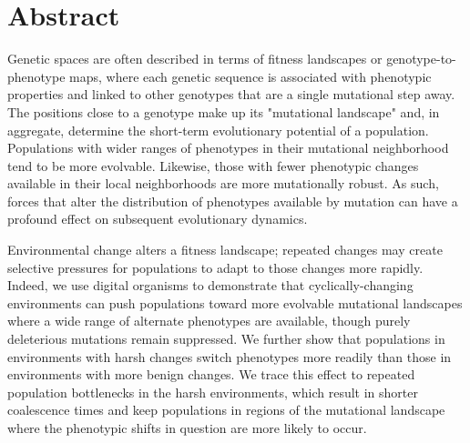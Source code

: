 \documentclass[10pt,letterpaper]{article}
\begin{document}
\section*{Abstract}
Genetic spaces are often described in terms of fitness landscapes or genotype-to-phenotype maps, where each genetic sequence is associated with phenotypic properties and linked to other genotypes that are a single mutational step away.  The positions close to a genotype make up its "mutational landscape" and, in aggregate, determine the short-term evolutionary potential of a population.
Populations with wider ranges of phenotypes in their mutational neighborhood tend to be more evolvable. Likewise, those with fewer phenotypic changes available in their local neighborhoods are more mutationally robust. As such, forces that alter the distribution of phenotypes available by mutation can have a profound effect on subsequent evolutionary dynamics.

Environmental change alters a fitness landscape; repeated changes may create selective pressures for populations to adapt to those changes more rapidly.  Indeed, we use digital organisms to demonstrate that cyclically-changing environments can push populations toward more evolvable mutational landscapes where a wide range of alternate phenotypes are available, though purely deleterious mutations remain suppressed.
We further show that populations in environments with harsh changes switch phenotypes more readily than those in environments with more benign changes. We trace this effect to repeated population bottlenecks in the harsh environments, which result in shorter coalescence times and keep populations in regions of the mutational landscape where the phenotypic shifts in question are more likely to occur.

\linenumbers

\end{document}
